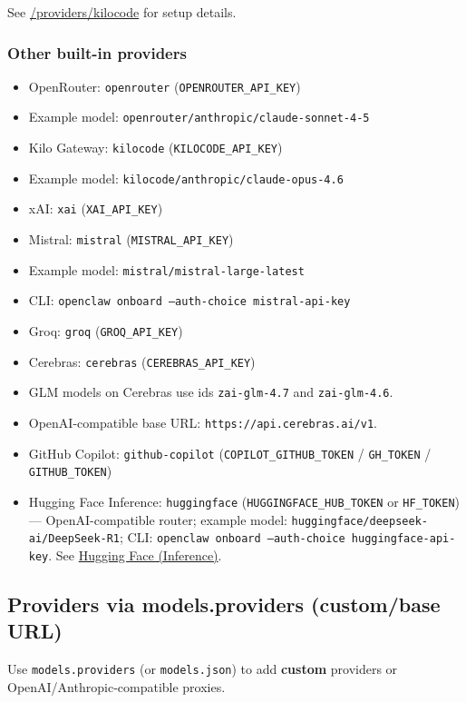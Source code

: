 See \href{/providers/kilocode}{/providers/kilocode} for setup details.

\subsubsection{Other built-in providers}


\begin{itemize}
  \item OpenRouter: \texttt{openrouter} (\texttt{OPENROUTER\_API\_KEY})
  \item Example model: \texttt{openrouter/anthropic/claude-sonnet-4-5}
  \item Kilo Gateway: \texttt{kilocode} (\texttt{KILOCODE\_API\_KEY})
  \item Example model: \texttt{kilocode/anthropic/claude-opus-4.6}
  \item xAI: \texttt{xai} (\texttt{XAI\_API\_KEY})
  \item Mistral: \texttt{mistral} (\texttt{MISTRAL\_API\_KEY})
  \item Example model: \texttt{mistral/mistral-large-latest}
  \item CLI: \texttt{openclaw onboard --auth-choice mistral-api-key}
  \item Groq: \texttt{groq} (\texttt{GROQ\_API\_KEY})
  \item Cerebras: \texttt{cerebras} (\texttt{CEREBRAS\_API\_KEY})
  \item GLM models on Cerebras use ids \texttt{zai-glm-4.7} and \texttt{zai-glm-4.6}.
  \item OpenAI-compatible base URL: \texttt{https://api.cerebras.ai/v1}.
  \item GitHub Copilot: \texttt{github-copilot} (\texttt{COPILOT\_GITHUB\_TOKEN} / \texttt{GH\_TOKEN} / \texttt{GITHUB\_TOKEN})
  \item Hugging Face Inference: \texttt{huggingface} (\texttt{HUGGINGFACE\_HUB\_TOKEN} or \texttt{HF\_TOKEN}) — OpenAI-compatible router; example model: \texttt{huggingface/deepseek-ai/DeepSeek-R1}; CLI: \texttt{openclaw onboard --auth-choice huggingface-api-key}. See \href{/providers/huggingface}{Hugging Face (Inference)}.
\end{itemize}


\subsection{Providers via models.providers (custom/base URL)}


Use \texttt{models.providers} (or \texttt{models.json}) to add \textbf{custom} providers or
OpenAI/Anthropic‑compatible proxies.

